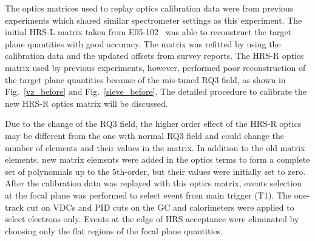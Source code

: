  The optics matrices used to replay optics calibration data were from previous experiments which shared similar spectrometer settings as this experiment. The initial HRS-L matrix taken from E05-102~\cite{jinge_thesis} was able to reconstruct the target plane quantities with good accuracy. The matrix was refitted by using the calibration data and the updated offsets from survey reports. The HRS-R optics matrix used by previous experiments, however, performed poor reconstruction of the target plane quantities because of the mis-tuned RQ3 field, as shown in Fig.~\ref{vz_before} and Fig.~\ref{sieve_before}. The detailed procedure to calibrate the new HRS-R optics matrix will be discussed. 

 Due to the change of the RQ3 field, the higher order effect of the HRS-R optics may be different from the one with normal RQ3 field and could change the number of elements and their values in the matrix. In addition to the old matrix elements, new matrix elements were added in the optics terms to form a complete set of polynomials up to the 5th-order, but their values were initially set to zero. After the calibration data was replayed with this optics matrix, events selection at the focal plane was performed to select event from main trigger (T1). The one-track cut on VDCs and PID cuts on the GC and calorimeters were applied to select electrons only. Events at the edge of HRS acceptance were eliminated by choosing only the flat regions of the focal plane quantities. 

